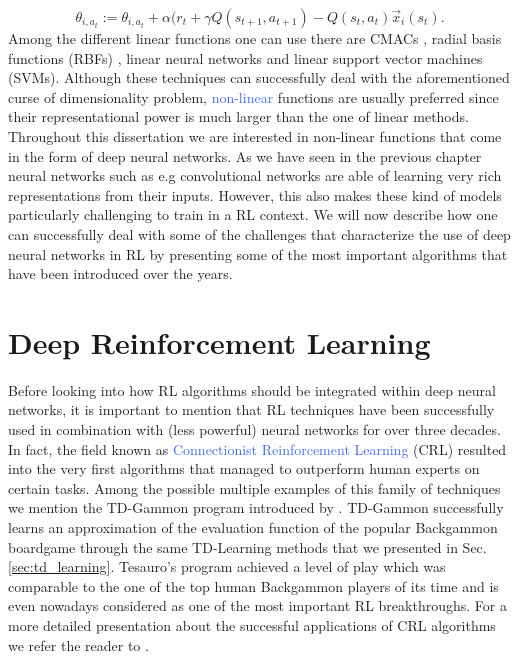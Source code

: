 \begin{equation}
	\theta_{i,a_t} := \theta_{i,a_t} + \alpha(r_t +\gamma Q(s_{t+1},a_{t+1}) - Q(s_t, a_t)\vec{x}_i(s_t).
\end{equation}
Among the different linear functions one can use there are CMACs \cite{lane1992theory}, radial basis functions (RBFs) \cite{park1993approximation}, linear neural networks \cite{mcculloch1943logical} and linear support vector machines (SVMs). Although these techniques can successfully deal with the aforementioned curse of dimensionality problem, \textcolor{RoyalBlue}{non-linear} functions are usually preferred since their representational power is much larger than the one of linear methods. Throughout this dissertation we are interested in non-linear functions that come in the form of deep neural networks. As we have seen in the previous chapter neural networks such as e.g convolutional networks are able of learning very rich representations from their inputs. However, this also makes these kind of models particularly challenging to train in a RL context. We will now describe how one can successfully deal with some of the challenges that characterize the use of deep neural networks in RL by presenting some of the most important algorithms that have been introduced over the years.    

\section{Deep Reinforcement Learning}
\label{sec:deep_reinforcement_learning}
Before looking into how RL algorithms should be integrated within deep neural networks, it is important to mention that RL techniques have been successfully used in combination with (less powerful) neural networks for over three decades. In fact, the field known as \textcolor{RoyalBlue}{Connectionist Reinforcement Learning} (CRL) resulted into the very first algorithms that managed to outperform human experts on certain tasks. Among the possible multiple examples of this family of techniques we mention the TD-Gammon program introduced by \citet{tesauro1994td}. TD-Gammon successfully learns an approximation of the evaluation function of the popular Backgammon boardgame through the same TD-Learning methods that we presented in Sec. \ref{sec:td_learning}. Tesauro's program achieved a level of play which was comparable to the one of the top human Backgammon players of its time and is even nowadays considered as one of the most important RL breakthroughs. For a more detailed presentation about the successful applications of CRL algorithms we refer the reader to \cite{bucsoniu2011approximate}.  

